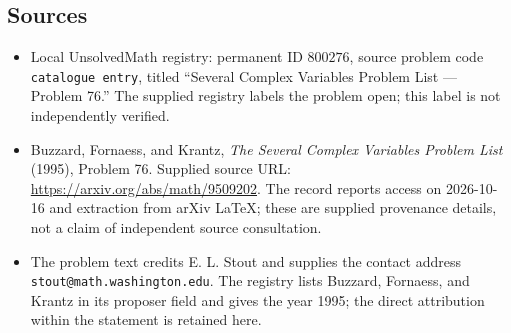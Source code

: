 \documentclass[11pt]{article}
\begin{document}
\subsection{Sources}
\begin{itemize}
\item Local UnsolvedMath registry: permanent ID \(800276\), source problem code \texttt{catalogue entry}, titled ``Several Complex Variables Problem List --- Problem 76.'' The supplied registry labels the problem open; this label is not independently verified.
\item Buzzard, Fornaess, and Krantz, \emph{The Several Complex Variables Problem List} (1995), Problem 76. Supplied source URL: \url{https://arxiv.org/abs/math/9509202}. The record reports access on 2026-10-16 and extraction from arXiv LaTeX; these are supplied provenance details, not a claim of independent source consultation.
\item The problem text credits E. L. Stout and supplies the contact address \texttt{stout@math.washington.edu}. The registry lists Buzzard, Fornaess, and Krantz in its proposer field and gives the year 1995; the direct attribution within the statement is retained here.
\end{itemize}
\end{document}
